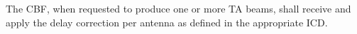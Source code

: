 The CBF, when requested to produce one or more TA beams, shall receive and
apply the delay correction per antenna as defined in the appropriate ICD.

